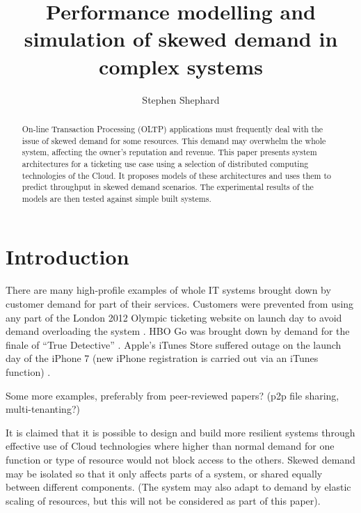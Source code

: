 \documentclass[runningheads]{llncs}
\begin{document}
\title{Performance modelling and simulation of skewed demand in complex systems}

\author{Stephen Shephard}


\maketitle

%
%
\begin{abstract}
On-line Transaction Processing (OLTP) applications must frequently deal with the issue of skewed demand for some resources.  This demand may overwhelm the whole system, affecting the owner's reputation and revenue.  This paper presents system architectures for a ticketing use case using a selection of distributed computing technologies of the Cloud.  It proposes models of these architectures and uses them to predict throughput in skewed demand scenarios.  The experimental results of the models are then tested against simple built systems.
\end{abstract}

%
%

\section{Introduction}\label{sec:introduction}

There are many high-profile examples of whole IT systems brought down by customer demand for part of their services.  Customers were prevented from using any part of the London 2012 Olympic ticketing website on launch day to avoid demand overloading the system \cite{RN1067}.  HBO Go was brought down by demand for the finale of ``True Detective'' \cite{RN1066}.  Apple's iTunes Store suffered outage on the launch day of the iPhone 7 (new iPhone registration is carried out via an iTunes function) \cite{RN1068}.
\begin{shaded}
Some more examples, preferably from peer-reviewed papers? (p2p file sharing, multi-tenanting?)
\end{shaded}
It is claimed that it is possible to design and build more resilient systems through effective use of Cloud technologies where higher than normal demand for one function or type of resource would not block access to the others.  Skewed demand may be isolated so that it only affects parts of a system, or shared equally between different components. (The system may also adapt to demand by elastic scaling of resources, but this will not be considered as part of this paper).
\end{document}

